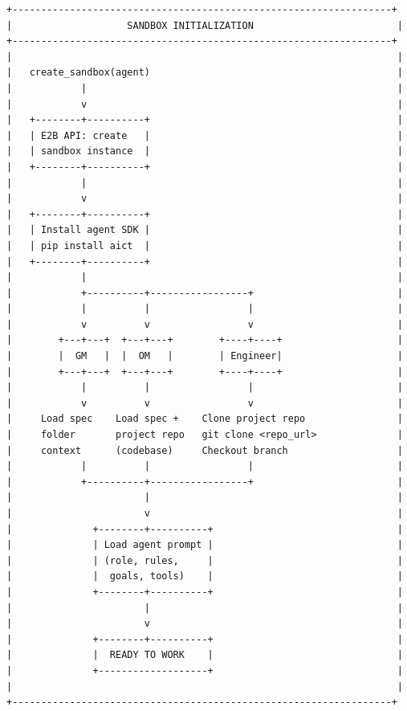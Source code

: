 \documentclass[11pt,a4paper]{article}
\begin{document}
\begin{verbatim}
+------------------------------------------------------------------+
|                    SANDBOX INITIALIZATION                         |
+------------------------------------------------------------------+
|                                                                   |
|   create_sandbox(agent)                                           |
|            |                                                      |
|            v                                                      |
|   +--------+----------+                                           |
|   | E2B API: create   |                                           |
|   | sandbox instance  |                                           |
|   +--------+----------+                                           |
|            |                                                      |
|            v                                                      |
|   +--------+----------+                                           |
|   | Install agent SDK |                                           |
|   | pip install aict  |                                           |
|   +--------+----------+                                           |
|            |                                                      |
|            +----------+-----------------+                         |
|            |          |                 |                         |
|            v          v                 v                         |
|        +---+---+  +---+---+        +----+----+                    |
|        |  GM   |  |  OM   |        | Engineer|                    |
|        +---+---+  +---+---+        +----+----+                    |
|            |          |                 |                         |
|            v          v                 v                         |
|     Load spec    Load spec +    Clone project repo                |
|     folder       project repo   git clone <repo_url>              |
|     context      (codebase)     Checkout branch                   |
|            |          |                 |                         |
|            +----------+-----------------+                         |
|                       |                                           |
|                       v                                           |
|              +--------+----------+                                |
|              | Load agent prompt |                                |
|              | (role, rules,     |                                |
|              |  goals, tools)    |                                |
|              +--------+----------+                                |
|                       |                                           |
|                       v                                           |
|              +--------+----------+                                |
|              |  READY TO WORK    |                                |
|              +-------------------+                                |
|                                                                   |
+------------------------------------------------------------------+
\end{verbatim}
\end{document}
